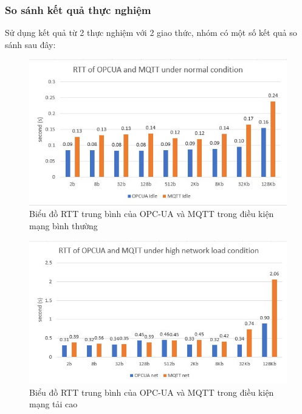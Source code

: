 \subsubsection{So sánh kết quả thực nghiệm}

Sử dụng kết quả từ 2 thực nghiệm với 2 giao thức, nhóm có một số kết quả so sánh sau đây:

\begin{figure}[!h]
    \centering
    \includegraphics[width=1\textwidth]{Images/Comparing_experiment/comp_opc_mqtt_0.jpg}
    \caption{Biểu đồ RTT trung bình của OPC-UA và MQTT trong điều kiện mạng bình thường}
    \label{fig:comp_opc_mqtt_0}
\end{figure}

\begin{figure}[!h]
    \centering
    \includegraphics[width=1\textwidth]{Images/Comparing_experiment/comp_opc_mqtt_1.jpg}
    \caption{Biểu đồ RTT trung bình của OPC-UA và MQTT trong điều kiện mạng tải cao}
    \label{fig:comp_opc_mqtt_1}
\end{figure}



